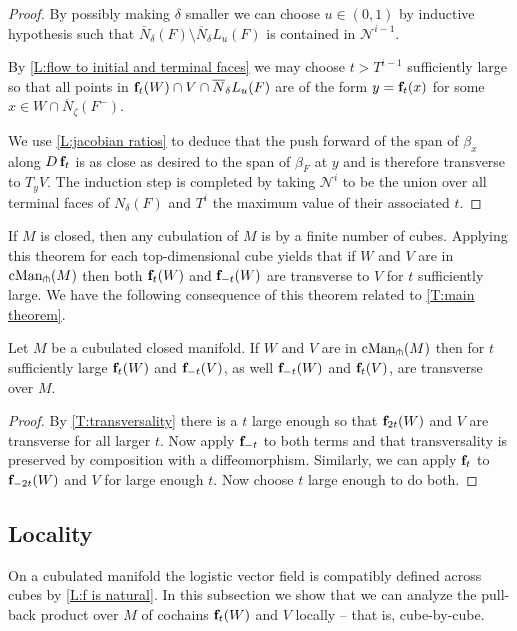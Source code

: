 \begin{proof}
	By possibly making $\delta$ smaller we can choose $u \in (0, 1)$ by inductive hypothesis such that $\overline N_\delta(F) \setminus \overline N_\delta L_u(F)$ is contained in $\mathcal N^{i-1}$.

	By \cref{L:flow to initial and terminal faces} we may choose $t > T^{i-1}$ sufficiently large so that all points in $\mathbf{f}_t(W) \cap V \cap \overline N_\delta L_u(F)$ are of the form $y = \mathbf{f}_t(x)$ for some $x \in W \cap \overline N_\zeta(F^-)$.

	We use \cref{L:jacobian ratios} to deduce that the push forward of the span of $\beta_x$ along $D\,\mathbf{f}_t$ is as close as desired to the span of $\beta_F$ at $y$ and is therefore transverse to $T_y V$.
	The induction step is completed by taking $\mathcal N^i$ to be the union over all terminal faces of $N_\delta(F)$ and $T^i$ the maximum value of their associated $t$.
\end{proof}

If $M$ is closed, then any cubulation of $M$ is by a finite number of cubes.
Applying this theorem for each top-dimensional cube yields that if $W$ and $V$ are in $\mathrm{cMan}_\pitchfork(M)$ then both $\mathbf{f}_t(W)$ and $\mathbf{f}_{-t}(W)$ are transverse to $V$ for $t$ sufficiently large.
We have the following consequence of this theorem related to \cref{T:main theorem}.

\begin{corollary}\label{C:transversality}
	Let $M$ be a cubulated closed manifold.
	If $W$ and $V$ are in $\mathrm{cMan}_\pitchfork(M)$ then for $t$ sufficiently large $\mathbf{f}_t(W)$ and $\mathbf{f}_{-t}(V)$, as well $\mathbf{f}_{-t}(W)$ and $\mathbf{f}_t(V)$, are transverse over $M$.
\end{corollary}

\begin{proof}
	By \cref{T:transversality} there is a $t$ large enough so that $\mathbf{f}_{2t}(W)$ and $V$ are transverse for all larger $t$.
	Now apply $\mathbf{f}_{-t}$ to both terms and that transversality is preserved by composition with a diffeomorphism.
	Similarly, we can apply $\mathbf{f}_t$ to $\mathbf{f}_{-2t}(W)$ and $V$ for large enough $t$.
	Now choose $t$ large enough to do both.
\end{proof}

\subsection{Locality}

On a cubulated manifold the logistic vector field is compatibly defined across cubes by \cref{L:f is natural}.
In this subsection we show that we can analyze the pull-back product over $M$ of cochains $\mathbf{f}_t(W)$ and $V$ locally -- that is, cube-by-cube.

